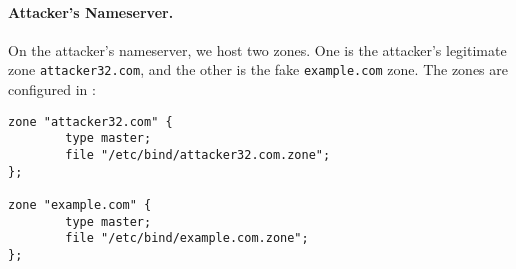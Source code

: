 \paragraph{Attacker's Nameserver.}
On the attacker's nameserver, we host two zones. One is 
the attacker's legitimate zone \texttt{attacker32.com}, and the other 
is the fake \texttt{example.com} zone. The zones are 
configured in :

\begin{lstlisting}
zone "attacker32.com" {
        type master;
        file "/etc/bind/attacker32.com.zone";
};

zone "example.com" {
        type master;
        file "/etc/bind/example.com.zone";
};
\end{lstlisting}

